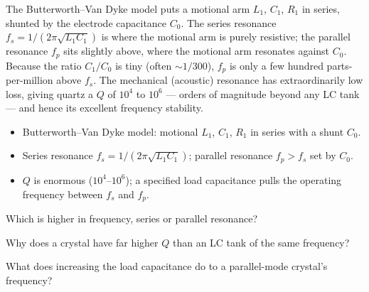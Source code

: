 \begin{workedexample}
The Butterworth--Van Dyke model puts a motional arm $L_1$, $C_1$, $R_1$ in series,
shunted by the electrode capacitance $C_0$. The series resonance
$f_s = 1/(2\pi\sqrt{L_1 C_1})$ is where the motional arm is purely resistive; the
parallel resonance $f_p$ sits slightly above, where the motional arm resonates
against $C_0$. Because the ratio $C_1/C_0$ is tiny (often $\sim 1/300$), $f_p$ is
only a few hundred parts-per-million above $f_s$. The mechanical (acoustic)
resonance has extraordinarily low loss, giving quartz a $Q$ of $10^4$ to $10^6$ ---
orders of magnitude beyond any LC tank --- and hence its excellent frequency stability.
\end{workedexample}

\begin{keytakeaways}
\begin{itemize}[leftmargin=1.4em,itemsep=2pt]
\item Butterworth--Van Dyke model: motional $L_1$, $C_1$, $R_1$ in series with a shunt $C_0$.
\item Series resonance $f_s = 1/(2\pi\sqrt{L_1 C_1})$; parallel resonance $f_p > f_s$ set by $C_0$.
\item $Q$ is enormous ($10^4$--$10^6$); a specified load capacitance pulls the operating frequency between $f_s$ and $f_p$.
\end{itemize}
\end{keytakeaways}

\begin{exercises}
\item Which is higher in frequency, series or parallel resonance?
\item Why does a crystal have far higher $Q$ than an LC tank of the same frequency?
\item What does increasing the load capacitance do to a parallel-mode crystal's frequency?
\end{exercises}


